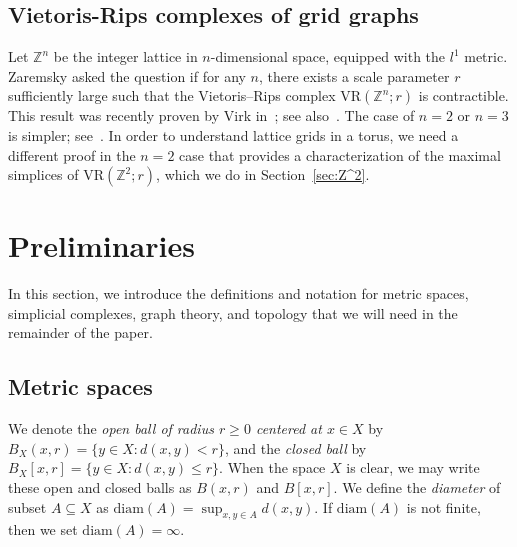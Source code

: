 \documentclass[12pt,a4paper]{amsart}
\theoremstyle{definition}
\newcommand{\Z}{\ensuremath{\mathbb{Z}}}
\newcommand{\vr}[2]{\mathrm{VR}(#1;#2)}
\newcommand{\diam}{\ensuremath{\mathrm{diam}}}
\numberwithin{equation}{section}
\begin{document}
\subsection*{Vietoris-Rips complexes of grid graphs}

Let $\Z^n$ be the integer lattice in $n$-dimensional space, equipped with the $l^1$ metric.
Zaremsky asked the question if for any $n$, there exists a scale parameter $r$ sufficiently large such that the Vietoris--Rips complex $\vr{\Z^n}{r}$ is contractible.
This result was recently proven by Virk in~\cite{virk2024contractibility}; see also~\cite{zaremsky2024contractible}.
The case of $n=2$ or $n=3$ is simpler; see~\cite{373007,wang2024contractibilityvietorisripscomplexesdense}.
In order to understand lattice grids in a torus, we need a different proof in the $n=2$ case that provides a characterization of the maximal simplices of $\vr{\Z^2}{r}$, which we do in Section~\ref{sec:Z^2}.



\section{Preliminaries}
\label{sec:preliminaries}

In this section, we introduce the definitions and notation for metric spaces, simplicial complexes, graph theory, and topology that we will need in the remainder of the paper.


\subsection{Metric spaces}
\label{ssec:metric-spaces}

We denote the \emph{open ball of radius $r\ge 0$ centered at $x\in X$} by $B_X(x,r) = \{ y\in X : d(x,y) < r\}$, and the \emph{closed ball} by $B_X[x,r] = \{ y\in X : d(x,y) \le r\}$.
When the space $X$ is clear, we may write these open and closed balls as $B(x,r)$ and $B[x,r]$.
We define the \emph{diameter} of subset $A\subseteq X$ as $\diam(A)=\sup_{x, y \in A }d(x,y)$.
If $\diam(A)$ is not finite, then we set $\diam(A) = \infty$.
\end{document}
